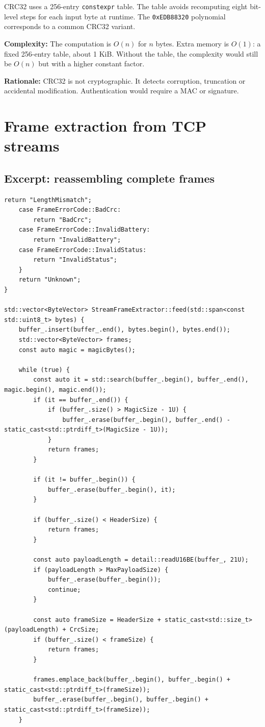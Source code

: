 \documentclass[10pt,a4paper]{article}
\newcommand{\complexity}[1]{\textbf{Complexity:} #1}
\newcommand{\rationale}[1]{\textbf{Rationale:} #1}
\begin{document}
CRC32 uses a 256-entry \texttt{constexpr} table. The table avoids recomputing eight bit-level steps for each input byte at runtime. The \texttt{0xEDB88320} polynomial corresponds to a common CRC32 variant.

\complexity{The computation is $O(n)$ for $n$ bytes. Extra memory is $O(1)$: a fixed 256-entry table, about 1 KiB. Without the table, the complexity would still be $O(n)$ but with a higher constant factor.}

\rationale{CRC32 is not cryptographic. It detects corruption, truncation or accidental modification. Authentication would require a MAC or signature.}

\section{Frame extraction from TCP streams}

\subsection{Excerpt: reassembling complete frames}
\begin{lstlisting}[caption={Complete frame extraction from a TCP stream}]
        return "LengthMismatch";
    case FrameErrorCode::BadCrc:
        return "BadCrc";
    case FrameErrorCode::InvalidBattery:
        return "InvalidBattery";
    case FrameErrorCode::InvalidStatus:
        return "InvalidStatus";
    }
    return "Unknown";
}

std::vector<ByteVector> StreamFrameExtractor::feed(std::span<const std::uint8_t> bytes) {
    buffer_.insert(buffer_.end(), bytes.begin(), bytes.end());
    std::vector<ByteVector> frames;
    const auto magic = magicBytes();

    while (true) {
        const auto it = std::search(buffer_.begin(), buffer_.end(), magic.begin(), magic.end());
        if (it == buffer_.end()) {
            if (buffer_.size() > MagicSize - 1U) {
                buffer_.erase(buffer_.begin(), buffer_.end() - static_cast<std::ptrdiff_t>(MagicSize - 1U));
            }
            return frames;
        }

        if (it != buffer_.begin()) {
            buffer_.erase(buffer_.begin(), it);
        }

        if (buffer_.size() < HeaderSize) {
            return frames;
        }

        const auto payloadLength = detail::readU16BE(buffer_, 21U);
        if (payloadLength > MaxPayloadSize) {
            buffer_.erase(buffer_.begin());
            continue;
        }

        const auto frameSize = HeaderSize + static_cast<std::size_t>(payloadLength) + CrcSize;
        if (buffer_.size() < frameSize) {
            return frames;
        }

        frames.emplace_back(buffer_.begin(), buffer_.begin() + static_cast<std::ptrdiff_t>(frameSize));
        buffer_.erase(buffer_.begin(), buffer_.begin() + static_cast<std::ptrdiff_t>(frameSize));
    }
\end{lstlisting}
\end{document}
